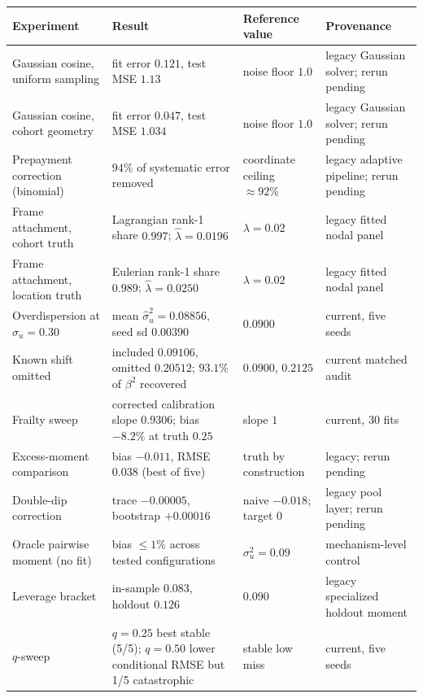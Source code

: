 \documentclass[11pt]{article}
\begin{document}
\begin{center}
\small
\begin{tabularx}{\textwidth}{@{}p{}X p{}p{}@{}}
\toprule
Experiment & Result & Reference value & Provenance\\
\midrule
Gaussian cosine, uniform sampling & fit error $0.121$, test MSE $1.13$ & noise floor $1.0$ & legacy Gaussian solver; rerun pending\\
Gaussian cosine, cohort geometry & fit error $0.047$, test MSE $1.034$ & noise floor $1.0$ & legacy Gaussian solver; rerun pending\\
Prepayment correction (binomial) & $94\%$ of systematic error removed & coordinate ceiling $\approx92\%$ & legacy adaptive pipeline; rerun pending\\
Frame attachment, cohort truth & Lagrangian rank-1 share $0.997$; $\hat\lambda=0.0196$ & $\lambda=0.02$ & legacy fitted nodal panel\\
Frame attachment, location truth & Eulerian rank-1 share $0.989$; $\hat\lambda=0.0250$ & $\lambda=0.02$ & legacy fitted nodal panel\\
Overdispersion at $\sigma_u=0.30$ & mean $\hat\sigma_u^2=0.08856$, seed sd $0.00390$ & $0.0900$ & current, five seeds\\
Known shift omitted & included $0.09106$, omitted $0.20512$; $93.1\%$ of $\beta^2$ recovered & $0.0900$, $0.2125$ & current matched audit\\
Frailty sweep & corrected calibration slope $0.9306$; bias $-8.2\%$ at truth $0.25$ & slope $1$ & current, 30 fits\\
Excess-moment comparison & bias $-0.011$, RMSE $0.038$ (best of five) & truth by construction & legacy; rerun pending\\
Double-dip correction & trace $-0.00005$, bootstrap $+0.00016$ & naive $-0.018$; target $0$ & legacy pool layer; rerun pending\\
Oracle pairwise moment (no fit) & bias $\le1\%$ across tested configurations & $\sigma_u^2=0.09$ & mechanism-level control\\
Leverage bracket & in-sample $0.083$, holdout $0.126$ & $0.090$ & legacy specialized holdout moment\\
$q$-sweep & $q=0.25$ best stable (5/5); $q=0.50$ lower conditional RMSE but 1/5 catastrophic & stable low miss & current, five seeds\\
\bottomrule
\end{tabularx}
\end{center}
\normalsize
\end{document}
